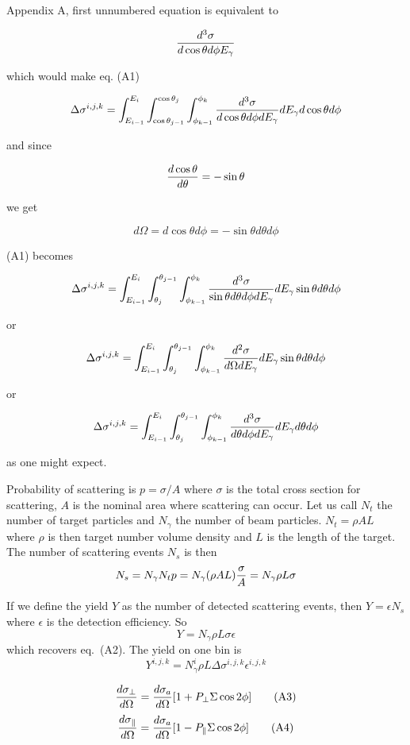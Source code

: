 \documentclass{article}
\begin{document}
Appendix A, first unnumbered equation is equivalent to 

$${d^3\sigma \over d\cos\theta d\phi E_\gamma}$$

which would make eq. (A1)

$$\Delta\sigma^{i,j,k} = \int^{E_i}_{E_{i-1}}\int^{\cos\theta_j}_{\cos\theta_{j-1}}\int^{\phi_k}_{\phi_{k-1}} {d^3\sigma \over d\cos\theta d\phi dE_\gamma}dE_\gamma d\cos\theta d\phi$$

and since

$${d\cos\theta \over d\theta} = -\sin\theta$$

we get

$$ d\Omega = d\cos\theta d\phi = -\sin\theta d\theta d\phi $$

(A1) becomes

$$\Delta\sigma^{i,j,k} = \int^{E_i}_{E_{i-1}}\int_{\theta_j}^{\theta_{j-1}}\int^{\phi_k}_{\phi_{k-1}} {d^3\sigma \over \sin\theta d\theta d\phi dE_\gamma} dE_\gamma \sin\theta d\theta d\phi$$

or

$$\Delta\sigma^{i,j,k} = \int^{E_i}_{E_{i-1}}\int_{\theta_j}^{\theta_{j-1}}\int^{\phi_k}_{\phi_{k-1}} {d^2\sigma \over d\Omega dE_\gamma} dE_\gamma \sin\theta d\theta d\phi$$

or

$$\Delta\sigma^{i,j,k} = \int^{E_i}_{E_{i-1}}\int_{\theta_j}^{\theta_{j-1}}\int^{\phi_k}_{\phi_{k-1}} {d^3\sigma \over d\theta d\phi dE_\gamma} dE_\gamma d\theta d\phi$$

as one might expect.

Probability of scattering is $p = \sigma/A$ where $\sigma$ is the total cross section for scattering, $A$ is the nominal area where scattering can occur. Let us call $N_t$ the number of target particles and $N_\gamma$ the number of beam particles. $N_t = \rho AL$ where $\rho$ is then target number volume density and $L$ is the length of the target. The number of scattering events $N_s$ is then
$$
N_s = N_\gamma N_t p = N_\gamma(\rho A L){\sigma\over A} = N_\gamma\rho L\sigma
$$

If we define the yield $Y$ as the number of detected scattering events, then $Y = \epsilon N_s$ where $\epsilon$ is the detection efficiency. So
$$
Y = N_\gamma\rho L\sigma\epsilon
$$
which recovers eq.~(A2). The yield on one bin is
$$
Y^{i,j,k} = N^i_\gamma\rho L\Delta\sigma^{i,j,k}\epsilon^{i,j,k}
$$

\begin{equation}
{d\sigma_\perp \over d\Omega} = {d\sigma_a \over d\Omega}[1+P_\perp\Sigma\cos 2\phi] \tag{A3} \\
\end{equation}
\begin{equation}
{d\sigma_\parallel \over d\Omega} = {d\sigma_a \over d\Omega}[1-P_\parallel\Sigma\cos 2\phi] \tag{A4} \\
\end{equation}
\end{document}
